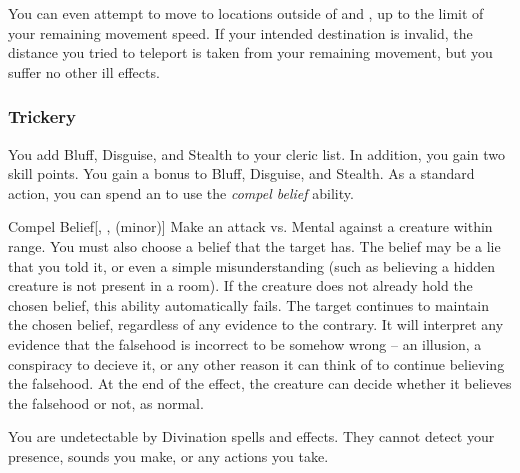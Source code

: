             You can even attempt to move to locations outside of  and , up to the limit of your remaining movement speed.
            If your intended destination is invalid, the distance you tried to teleport is taken from your remaining movement, but you suffer no other ill effects.

        \subsubsection{Trickery}
             You add Bluff, Disguise, and Stealth to your cleric  list.
            In addition, you gain two skill points.
             You gain a  bonus to Bluff, Disguise, and Stealth.
             As a standard action, you can spend an  to use the \textit{compel belief} ability.
            \begin{ability}{Compel Belief}[, ,  (minor)]
                Make an attack vs. Mental against a creature within \rngmed range.
                You must also choose a belief that the target has.
                The belief may be a lie that you told it, or even a simple misunderstanding (such as believing a hidden creature is not present in a room).
                If the creature does not already hold the chosen belief, this ability automatically fails.
                \hit The target continues to maintain the chosen belief, regardless of any evidence to the contrary.
                It will interpret any evidence that the falsehood is incorrect to be somehow wrong -- an illusion, a conspiracy to decieve it, or any other reason it can think of to continue believing the falsehood.
                At the end of the effect, the creature can decide whether it believes the falsehood or not, as normal.
            \end{ability}
             You are undetectable by Divination spells and effects.
            They cannot detect your presence, sounds you make, or any actions you take.

